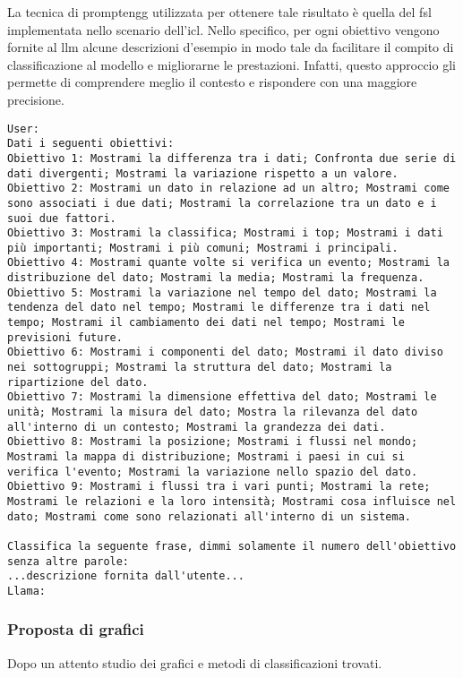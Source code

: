 La tecnica di \gls{promptengg} utilizzata per ottenere tale risultato è quella del \gls{fsl} implementata nello scenario dell'\gls{icl}.
Nello specifico, per ogni obiettivo vengono fornite al \gls{llm} alcune descrizioni d'esempio in modo tale da facilitare il compito di classificazione al modello e migliorarne le
prestazioni. Infatti, questo approccio gli permette di comprendere meglio il contesto e rispondere con una maggiore precisione.

\begin{verbatim}
User: 
Dati i seguenti obiettivi:
Obiettivo 1: Mostrami la differenza tra i dati; Confronta due serie di dati divergenti; Mostrami la variazione rispetto a un valore.
Obiettivo 2: Mostrami un dato in relazione ad un altro; Mostrami come sono associati i due dati; Mostrami la correlazione tra un dato e i suoi due fattori.
Obiettivo 3: Mostrami la classifica; Mostrami i top; Mostrami i dati più importanti; Mostrami i più comuni; Mostrami i principali.
Obiettivo 4: Mostrami quante volte si verifica un evento; Mostrami la distribuzione del dato; Mostrami la media; Mostrami la frequenza.
Obiettivo 5: Mostrami la variazione nel tempo del dato; Mostrami la tendenza del dato nel tempo; Mostrami le differenze tra i dati nel tempo; Mostrami il cambiamento dei dati nel tempo; Mostrami le previsioni future.
Obiettivo 6: Mostrami i componenti del dato; Mostrami il dato diviso nei sottogruppi; Mostrami la struttura del dato; Mostrami la ripartizione del dato.
Obiettivo 7: Mostrami la dimensione effettiva del dato; Mostrami le unità; Mostrami la misura del dato; Mostra la rilevanza del dato all'interno di un contesto; Mostrami la grandezza dei dati.
Obiettivo 8: Mostrami la posizione; Mostrami i flussi nel mondo; Mostrami la mappa di distribuzione; Mostrami i paesi in cui si verifica l'evento; Mostrami la variazione nello spazio del dato.
Obiettivo 9: Mostrami i flussi tra i vari punti; Mostrami la rete; Mostrami le relazioni e la loro intensità; Mostrami cosa influisce nel dato; Mostrami come sono relazionati all'interno di un sistema. 

Classifica la seguente frase, dimmi solamente il numero dell'obiettivo senza altre parole: 
...descrizione fornita dall'utente...
Llama:
\end{verbatim}

\subsubsection{Proposta di grafici}
Dopo un attento studio dei grafici e metodi di classificazioni trovati.

